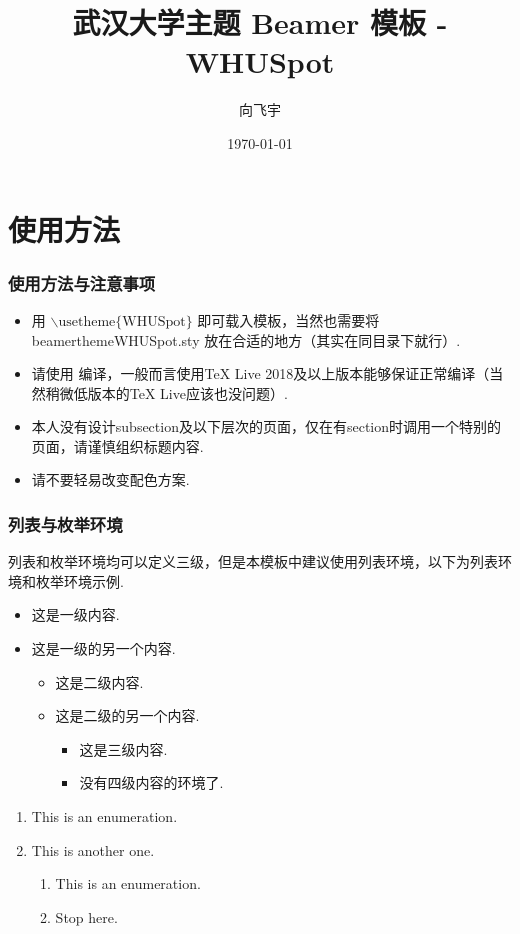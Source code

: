 \documentclass{beamer}
\title{武汉大学主题 Beamer 模板 - WHUSpot}
\author{向飞宇}
\institute{武汉大学}
\date{\today}
\begin{document}
\begin{frame}
    \titlepage
\end{frame}

\section{使用方法}

\begin{frame}
    \frametitle{使用方法与注意事项}
    \begin{itemize}
        \item 用 $\backslash \mbox{usetheme\{WHUSpot\}}$ 即可载入模板，当然也需要将 beamerthemeWHUSpot.sty 放在合适的地方（其实在同目录下就行）.
        \item 请使用  编译，一般而言使用\alert{TeX Live 2018}及以上版本能够保证正常编译（当然稍微低版本的TeX Live应该也没问题）.
        \item 本人\alert{没有设计subsection及以下层次}的页面，仅在有section时调用一个特别的页面，请谨慎组织标题内容.
        \item 请不要轻易改变配色方案.
    \end{itemize}
\end{frame}

\begin{frame}
    \frametitle{列表与枚举环境}
    列表和枚举环境均可以定义三级，但是本模板中\alert{建议使用列表环境}，以下为列表环境和枚举环境示例.
    \begin{itemize}
        \item 这是一级内容. \pause
        \item 这是一级的另一个内容. \pause
        \begin{itemize}
            \item 这是二级内容. \pause
            \item 这是二级的另一个内容. \pause
            \begin{itemize}
                 \item 这是三级内容. \pause
                 \item 没有四级内容的环境了. \pause
            \end{itemize} 
        \end{itemize}
    \end{itemize}

    \begin{enumerate}
        \item This is an enumeration. \pause
        \item This is another one. \pause
        \begin{enumerate}
             \item This is an enumeration. \pause
             \item Stop here. 
         \end{enumerate} 
    \end{enumerate}
\end{frame}
\end{document}

